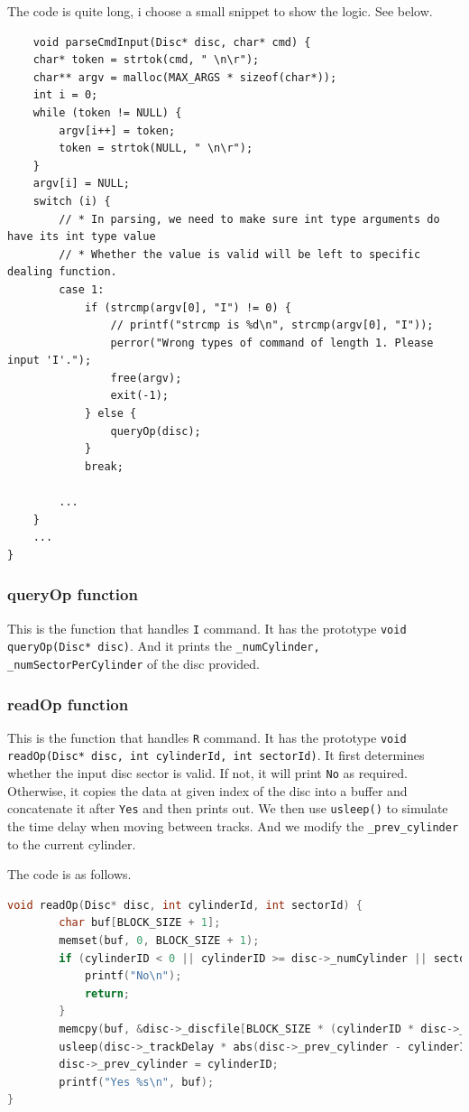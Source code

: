 The code is quite long, i choose a small snippet to show the logic. See below.

\begin{lstlisting}
    void parseCmdInput(Disc* disc, char* cmd) {
    char* token = strtok(cmd, " \n\r");
    char** argv = malloc(MAX_ARGS * sizeof(char*));
    int i = 0;
    while (token != NULL) {
        argv[i++] = token;
        token = strtok(NULL, " \n\r");
    }
    argv[i] = NULL;
    switch (i) {
        // * In parsing, we need to make sure int type arguments do have its int type value
        // * Whether the value is valid will be left to specific dealing function.
        case 1:
            if (strcmp(argv[0], "I") != 0) {
                // printf("strcmp is %d\n", strcmp(argv[0], "I"));
                perror("Wrong types of command of length 1. Please input 'I'.");
                free(argv);
                exit(-1);
            } else {
                queryOp(disc);
            }
            break;

        ...
    }
    ...
}
\end{lstlisting}

\subsubsection{queryOp function}
This is the function that handles \texttt{I} command. It has the prototype \texttt{void queryOp(Disc* disc)}. And it 
prints the \texttt{_numCylinder, _numSectorPerCylinder} of the disc provided. 

\subsubsection{readOp function}
This is the function that handles \texttt{R} command. It has the prototype \texttt{void readOp(Disc* disc, int cylinderId, int sectorId)}.
It first determines whether the input disc sector is valid. If not, it will print \texttt{No} as required.
Otherwise, it copies the data at given index of the disc into a buffer and concatenate it after \texttt{Yes} and then prints out.
We then use \texttt{usleep()} to simulate the time delay when moving between tracks. And we modify the \texttt{_prev_cylinder} to the current cylinder.

The code is as follows.

\begin{lstlisting}[language=C]
    void readOp(Disc* disc, int cylinderId, int sectorId) {
        char buf[BLOCK_SIZE + 1];
        memset(buf, 0, BLOCK_SIZE + 1);
        if (cylinderID < 0 || cylinderID >= disc->_numCylinder || sectorID < 0 || sectorID >= disc->_numSectorPerCylinder) {
            printf("No\n");
            return;
        }
        memcpy(buf, &disc->_discfile[BLOCK_SIZE * (cylinderID * disc->_numSectorPerCylinder + sectorID)], BLOCK_SIZE);
        usleep(disc->_trackDelay * abs(disc->_prev_cylinder - cylinderID));
        disc->_prev_cylinder = cylinderID;
        printf("Yes %s\n", buf);
}
\end{lstlisting}

